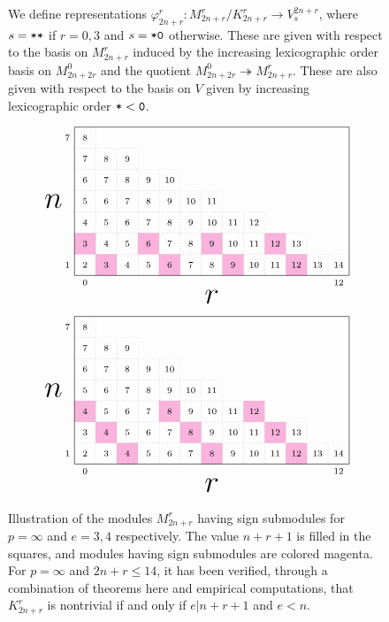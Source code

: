 \documentclass{amsart}
\begin{document}
\begin{figure}[h]
\caption{We define representations $\varphi_{2n + r}^r:M_{2n + r}^r/K_{2n + r}^r \rightarrow V^{2n + r}_{s}$, where $s = \texttt{*}\texttt{*}$ if $r = 0,3$ and $s = \texttt{*}\texttt{0}$ otherwise.
These are given with respect to the basis on $M_{2n + r}^r$ induced by the increasing lexicographic order basis on $M_{2n + 2r}^0$ and the quotient $M_{2n + 2r}^0 \twoheadrightarrow M_{2n + r}^r$.
These are also given with respect to the basis on $V$ given by increasing lexicographic order $\texttt{*} < \texttt{0}$.
  }\label{Fib Data}
\end{figure}

\begin{figure}[h]
  \[
    \ENRGrid{13/7}{2/1,5/1,8/1,11/1,1/2,4/2,7/2,10/2}
  \]\[
    \ENRGrid{13/7}{3/1,7/1,11/1,2/2,6/2,10/2,1/3,5/3,9/3}
  \]
  \caption{
    Illustration of the modules $M_{2n + r}^r$ having sign submodules for $p = \infty$ and $e = 3,4$ respectively.
    The value $n + r + 1$ is filled in the squares, and modules having sign submodules are colored magenta.
    For $p = \infty$ and $2n + r \leq 14$, it has been verified, through a combination of theorems here and empirical computations, that $K_{2n + r}^r$ is nontrivial if and only if $e | n+r+1$ and $e < n$.
  }\label{Empirical Kernel}
\end{figure}

\def\qqo{\alpha}
\def\tto{\beta}
\def\vtv{\gamma}
\def\fft{\delta}
\def\fto{\varepsilon}
\setcounter{MaxMatrixCols}{20}
\end{document}
